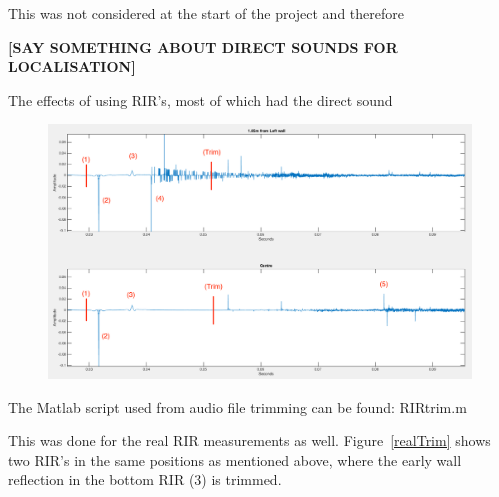 \documentclass[../../main.tex]{subfiles}
\begin{document}
		This was not considered at the start of the project and therefore 

		\begin{center}
			\textbf{[SAY SOMETHING ABOUT DIRECT SOUNDS FOR LOCALISATION]}
		\end{center}

		The effects of using \ac{RIR}'s, most of which had the direct sound

		\begin{figure}[H]
			\centerline{\includegraphics[scale = 0.4]{Sections/Implementation/Max/images/Latency/odeonLatency_edit.png}}
			\caption{}
			\label{odeonTrim}
		\end{figure}

		The Matlab script used from audio file trimming can be found: RIRtrim.m

		This was done for the real \ac{RIR} measurements as well. Figure~\ref{realTrim} shows two \ac{RIR}'s in the same positions as mentioned above, where the early wall reflection in the bottom \ac{RIR} (3) is trimmed.



		
\end{document}
